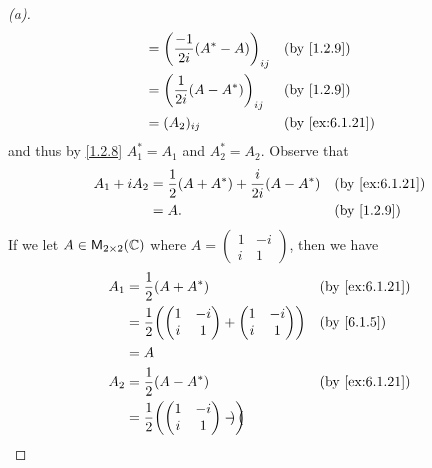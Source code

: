 \begin{proof}[(a)]
\begin{align*}
                                                      & = \pa{\dfrac{-1}{2i} (A^* - A)}_{i j}                  &  & \by{1.2.9}     \\
                                                      & = \pa{\dfrac{1}{2i} (A - A^*)}_{i j}                   &  & \by{1.2.9}     \\
                                                      & = (A_2)_{i j}                                          &  & \by{ex:6.1.21}
  \end{align*}
  and thus by \cref{1.2.8} \(A_1^* = A_1\) and \(A_2^* = A_2\).
  Observe that
  \begin{align*}
    A_1 + i A_2 & = \dfrac{1}{2} (A + A^*) + \dfrac{i}{2i} (A - A^*) &  & \by{ex:6.1.21} \\
                & = A.                                               &  & \by{1.2.9}
  \end{align*}
  If we let \(A \in \ms[2][2][\C]\) where \(A = \begin{pmatrix}
    1 & -i \\
    i & 1
  \end{pmatrix}\), then we have
  \begin{align*}
    A_1          & = \dfrac{1}{2} (A + A^*)           &  & \by{ex:6.1.21}            \\
                 & = \dfrac{1}{2} \pa{\begin{pmatrix}
                                          1 & -i \\
                                          i & 1
                                        \end{pmatrix} + \begin{pmatrix}
                                                          1 & -i \\
                                                          i & 1
                                                        \end{pmatrix}} &  & \by{6.1.5} \\
                 & = A                                                               \\
    A_2          & = \dfrac{1}{2} (A - A^*)           &  & \by{ex:6.1.21}            \\
                 & = \dfrac{1}{2} \pa{\begin{pmatrix}
                                          1 & -i \\
                                          i & 1
                                        \end{pmatrix} - \begin{pmatrix}

\end{pmatrix}}
\end{align*}
\end{proof}

